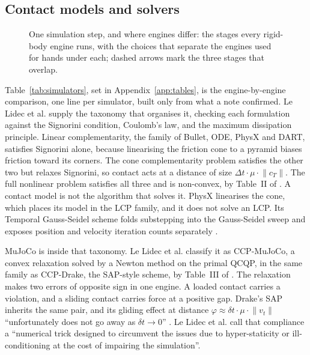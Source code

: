 \subsection{Contact models and solvers}
\label{sec:sim:engines}

\begin{figure}[!t]
  \centering
  \caption{One simulation step, and where engines differ: the stages every rigid-body engine runs,
  with the choices that separate the engines used for hands under each; dashed arrows mark the
  three stages that overlap.}
  \label{fig:simstep}
\end{figure}

Table~\ref{tab:simulators}, set in Appendix~\ref{app:tables}, is the engine-by-engine comparison,
one line per simulator, built only from what a note confirmed. Le Lidec et al. supply the taxonomy
that organises it, checking each formulation against the Signorini condition, Coulomb's law, and
the maximum dissipation principle. Linear complementarity, the family of Bullet, ODE, PhysX and
DART, satisfies Signorini alone, because linearising the friction cone to a pyramid biases
friction toward its corners. The cone complementarity problem satisfies the other two but relaxes
Signorini, so contact acts at a distance of size $\Delta t \cdot \mu \cdot \lVert c_T \rVert$. The
full nonlinear problem satisfies all three and is non-convex, by Table~II of
\cite{contact_models_comparison_2023}. A contact model is not the algorithm that solves
it. PhysX linearises the cone, which places its model in the LCP family, and it does not solve an
LCP. Its Temporal Gauss-Seidel scheme folds substepping into the Gauss-Seidel sweep and exposes
position and velocity iteration counts separately \cite[Sec.~3]{isaacgym_2021}.

MuJoCo is inside that taxonomy. Le Lidec et al. classify it as CCP-MuJoCo, a convex relaxation
solved by a Newton method on the primal QCQP, in the same family as CCP-Drake, the SAP-style
scheme, by Table~III of \cite{contact_models_comparison_2023}. The relaxation makes two errors
of opposite sign in one engine. A loaded contact carries a violation, and a sliding contact
carries force at a positive gap. Drake's SAP inherits the same pair, and its gliding effect at
distance $\varphi \approx \delta t \cdot \mu \cdot \lVert v_t \rVert$ ``unfortunately does not
go away as $\delta t \to 0$'' \cite[Sec.~V-A]{castro_sap_contact_2021}. Le Lidec et al. call
that compliance a ``numerical trick designed to circumvent the issues due to hyper-staticity or
ill-conditioning at the cost of impairing the simulation''.

